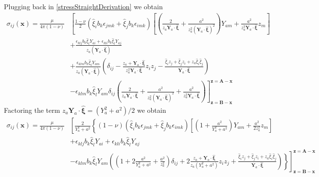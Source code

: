 Plugging back in \eqref{stressStraightDerivation} we obtain
\begin{align}
\sigma_{ij}(\bm x)
=\frac{\mu}{4\pi(1-\nu)}&\left[\frac{1-\nu}{2}\left(\hat{\xi}_ib_k\epsilon_{jmk}+\hat{\xi}_jb_k\epsilon_{imk}\right)\left[\left(\frac{2}{z_a\bm Y_a\cdot \hat{\bm \xi}}+\frac{a^2}{z_a^2(\bm Y_a\cdot \hat{\bm \xi})^2}\right)Y_{am}+\frac{a^2}{z_a^3 \bm Y_a\cdot \hat{\bm \xi}}z_m\right]\right.\nonumber\\
&+\frac{\epsilon_{klj}b_k\hat{\xi}_lY_{ai}+\epsilon_{kli}b_k\hat{\xi}_lY_{aj}}{z_a(\bm Y_a\cdot \hat{\bm \xi})}\nonumber\\
&+\frac{\epsilon_{klm}b_k\hat{\xi}_lY_{am}}{z_a(\bm Y_a\cdot \hat{\bm \xi})}\left(\delta_{ij}-\frac{z_a+\bm Y_a\cdot \hat{\bm \xi}}{z_a^2\bm Y_a\cdot \hat{\bm \xi}}z_iz_j-\frac{\hat{\xi}_iz_j+\hat{\xi}_jz_i+z_a\hat{\xi}_i\hat{\xi}_j}{\bm Y_a\cdot \hat{\bm \xi}}\right)\nonumber\\
&\left.-\epsilon_{klm}b_k\hat{\xi}_lY_{am}\delta_{ij}\left(\frac{2}{z_a\bm Y_a\cdot \hat{\bm \xi}}+\frac{a^2}{z_a^2(\bm Y_a\cdot \hat{\bm \xi})^2}+\frac{a^2}{z_a^3 \bm Y_a\cdot \hat{\bm \xi}}\right)\right]^{\bm z=\bm A-\bm x}_{\bm z=\bm B-\bm x}
\end{align}
Factoring the term $z_a\bm Y_a\cdot \hat{\bm \xi}=(Y_a^2+a^2)/2$ we obtain
{\small
\begin{align}
\sigma_{ij}(\bm x)
=\frac{\mu}{4\pi(1-\nu)}&\left[\frac{2}{Y_a^2+a^2}\left\{(1-\nu)\left(\hat{\xi}_ib_k\epsilon_{jmk}+\hat{\xi}_jb_k\epsilon_{imk}\right)\left[\left(1+\frac{a^2}{Y_a^2+a^2}\right)Y_{am}+\frac{a^2}{2z_a^2 }z_m\right]\right.\right.\nonumber\\
&+\epsilon_{klj}b_k\hat{\xi}_lY_{ai}+\epsilon_{kli}b_k\hat{\xi}_lY_{aj}\nonumber\\
&\left.\left.-\epsilon_{klm}b_k\hat{\xi}_lY_{am}\left(\left(1+2\frac{a^2}{Y_a^2+a^2}+\frac{a^2}{z_a^2 }\right)\delta_{ij}+2\frac{z_a+\bm Y_a\cdot \hat{\bm \xi}}{z_a(Y_a^2+a^2)}z_iz_j+\frac{\hat{\xi}_iz_j+\hat{\xi}_jz_i+z_a\hat{\xi}_i\hat{\xi}_j}{\bm Y_a\cdot \hat{\bm \xi}}\right)
\right\}\right]^{\bm z=\bm A-\bm x}_{\bm z=\bm B-\bm x}
%
\end{align}
}


